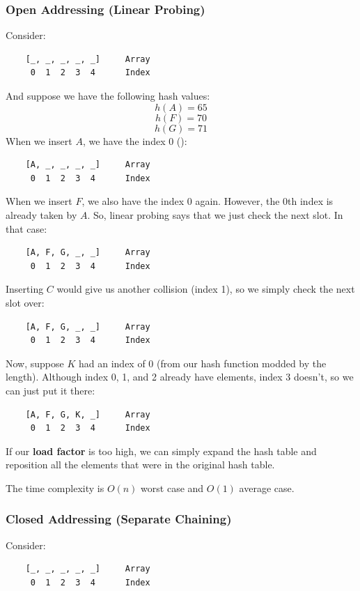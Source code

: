 \documentclass[letterpaper]{article}
\begin{document}
\subsubsection{Open Addressing (Linear Probing)}
Consider: 
\begin{verbatim}
    [_, _, _, _, _]     Array 
     0  1  2  3  4      Index 
\end{verbatim}
And suppose we have the following hash values: 
\[h(A) = 65\]
\[h(F) = 70\]
\[h(G) = 71\]
When we insert $A$, we have the index 0 (): 
\begin{verbatim}
    [A, _, _, _, _]     Array 
     0  1  2  3  4      Index 
\end{verbatim}
When we insert $F$, we also have the index 0 again. However, the 0th index is already taken by $A$. So, linear probing says that we just check the next slot. In that case:
\begin{verbatim}
    [A, F, G, _, _]     Array 
     0  1  2  3  4      Index 
\end{verbatim}
Inserting $C$ would give us another collision (index 1), so we simply check the next slot over: 
\begin{verbatim}
    [A, F, G, _, _]     Array 
     0  1  2  3  4      Index 
\end{verbatim}
Now, suppose $K$ had an index of 0 (from our hash function modded by the length). Although index 0, 1, and 2 already have elements, index 3 doesn't, so we can just put it there: 
\begin{verbatim}
    [A, F, G, K, _]     Array 
     0  1  2  3  4      Index 
\end{verbatim}
If our \textbf{load factor} is too high, we can simply expand the hash table and reposition all the elements that were in the original hash table. 

\bigskip

The time complexity is $O(n)$ worst case and $O(1)$ average case. 


\subsubsection{Closed Addressing (Separate Chaining)}
Consider: 
\begin{verbatim}
    [_, _, _, _, _]     Array 
     0  1  2  3  4      Index 
\end{verbatim}
\end{document}
